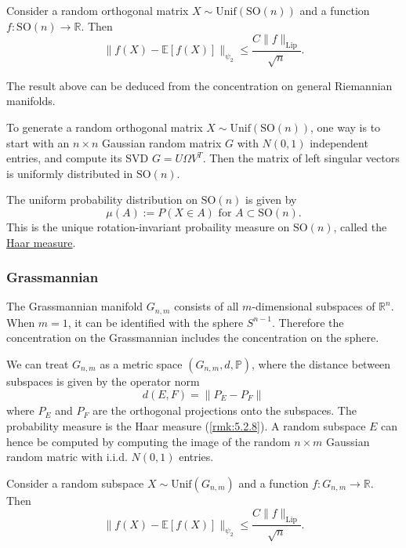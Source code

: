 \begin{theorem}
\label{thm:5.2.7}
Consider a random orthogonal matrix $X \sim \mathrm{Unif}(\mathrm{SO}(n))$ and a function $f: \mathrm{SO}(n) 
\to \mathbb{R}$. Then 
\[ \lVert f(X) - \mathbb{E}[f(X)] \rVert_{\psi_2} \leq \frac{C \lVert f \rVert_{\mathrm{Lip}}}{\sqrt{n}}. \]
\end{theorem}

The result above can be deduced from the concentration on general Riemannian manifolds.

\begin{remark}
\label{rmk:5.2.8}
To generate a random orthogonal matrix $X \sim \mathrm{Unif}(\mathrm{SO}(n))$, one way is to start with an 
$n \times n$ Gaussian random matrix $G$ with $N(0, 1)$ independent entries, and compute its SVD 
$G = U \Omega V^T$. Then the matrix of left singular vectors is uniformly distributed in $\mathrm{SO}(n)$.

The uniform probability distribution on $\mathrm{SO}(n)$ is given by 
\[ \mu(A) := P(X \in A) \text{ for } A \subset \mathrm{SO}(n). \]
This is the unique rotation-invariant probaility measure on $\mathrm{SO}(n)$, called the 
\underline{Haar measure}.
\end{remark}


\subsubsection{Grassmannian}
The Grassmannian manifold $G_{n, m}$ consists of all $m$-dimensional subspaces of $\mathbb{R}^n$. When $m = 1$, 
it can be identified with the sphere $S^{n - 1}$. Therefore the concentration on the Grassmannian includes the 
concentration on the sphere. 

We can treat $G_{n, m}$ as a metric space $(G_{n, m}, d, \mathbb{P})$, where the distance between subspaces is 
given by the operator norm
\[ d(E, F) = \lVert P_E - P_F \rVert_{} \]
where $P_E$ and $P_F$ are the orthogonal projections onto the subspaces. The probability measure is the Haar 
measure (\cref{rmk:5.2.8}). A random subspace $E$ can hence be computed by computing the image of the random 
$n \times m$ Gaussian random matric with i.i.d. $N(0, 1)$ entries.

\begin{theorem}
\label{thm:5.2.9}
Consider a random subspace $X \sim \mathrm{Unif}(G_{n, m})$ and a function $f: G_{n, m} \to \mathbb{R}$. Then 
\[ \lVert f(X) - \mathbb{E}[f(X)] \rVert_{\psi_2} \leq \frac{C \lVert f \rVert_{\mathrm{Lip}}}{\sqrt{n}}. \]
\end{theorem}

